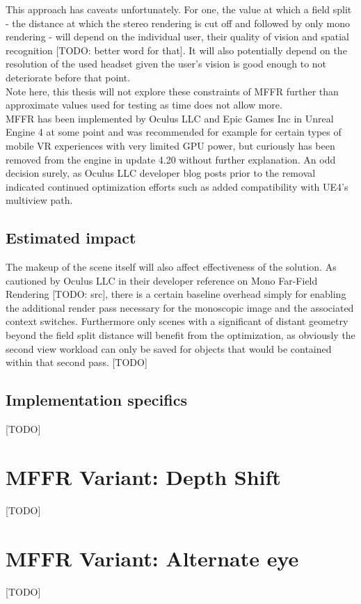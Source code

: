 This approach has caveats unfortunately. For one, the value at which a field split - the distance at which the stereo rendering is cut off and followed by only mono rendering - will depend on the individual user, their quality of vision and spatial recognition [TODO: better word for that]. It will also potentially depend on the resolution of the used headset given the user's vision is good enough to not deteriorate before that point. \\
Note here, this thesis will not explore these constraints of MFFR further than approximate values used for testing as time does not allow more. \\
MFFR has been implemented by Oculus LLC and Epic Games Inc in Unreal Engine 4 at some point and was recommended for example for certain types of mobile VR experiences with very limited GPU power, but curiously has been removed from the engine in update 4.20 without further explanation. An odd decision surely, as Oculus LLC developer blog posts prior to the removal indicated continued optimization efforts such as added compatibility with UE4's multiview path. 

\subsection{Estimated impact}
The makeup of the scene itself will also affect effectiveness of the solution. As cautioned by Oculus LLC in their developer reference on Mono Far-Field Rendering [TODO: src], there is a certain baseline overhead simply for enabling the additional render pass necessary for the monoscopic image and the associated context switches. Furthermore only scenes with a significant of distant geometry beyond the field split distance will benefit from the optimization, as obviously the second view workload can only be saved for objects that would be contained within that second pass. 
[TODO]

\subsection{Implementation specifics}
[TODO]



\section{MFFR Variant: Depth Shift}
[TODO]

\section{MFFR Variant: Alternate eye}
[TODO]
